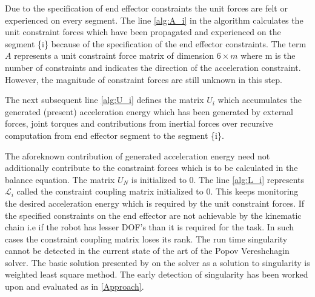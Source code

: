 \begin{itemize}
Due to the specification of end effector constraints the unit forces are felt or experienced on every segment.
The line \ref{alg:A_i} in the algorithm calculates the unit constraint forces which have been propagated and experienced on the segment \{i\} because of the specification of the end effector constraints. The term $A$ represents a unit constraint force matrix of dimension $6\times m$ where m is the number of constraints and indicates the direction of the acceleration constraint. However, the magnitude of constraint forces are still unknown in this step.


The next subsequent line \ref{alg:U_i} defines the matrix $U_{i}$ which accumulates the generated (present) acceleration energy which has been generated by external forces, joint torques and contributions from inertial forces over recursive computation from end effector segment to the segment \{i\}. 


The aforeknown contribution of generated acceleration energy need not additionally contribute to the constraint forces which is to be calculated in the balance equation. The matrix $U_{N}$ is initialized to 0. The line \ref{alg:L_i} represents $\mathcal{L}_{i}$ called the constraint coupling matrix initialized to 0. This keeps monitoring the desired acceleration energy which is required by the unit constraint forces. If the specified constraints on the end effector are not achievable by the kinematic chain i.e if the robot has lesser DOF's than it is required for the task. In such cases the constraint coupling matrix loses its rank. The run time singularity cannot be detected in the current state of the art of the Popov Vereshchagin solver. The basic solution presented by \cite{shakhimardanov2015composable} on the solver as a solution to singularity is weighted least square method. The early detection of singularity has been worked upon and evaluated as in \ref{Approach}. 



\end{itemize}
